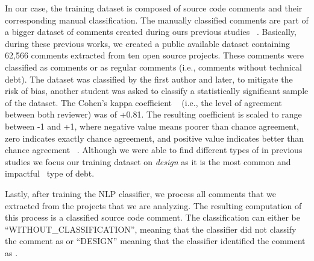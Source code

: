 In our case, the training dataset is composed of source code comments and their corresponding manual classification. The manually classified comments are part of a bigger dataset of \SATD comments created during ours previous studies ~\cite{Maldonado2015MTD,Maldonado2015TSE}. Basically, during these previous works, we created a public available dataset containing 62,566 comments extracted from ten open source projects. These comments were classified as \SATD comments or as regular comments (i.e., comments without technical debt). The dataset was classified by the first author and later, to mitigate the risk of bias, another student was asked to classify a statistically significant sample of the dataset. The Cohen's kappa coefficient ~\cite{cohen1960coefficient} (i.e., the level of agreement between both reviewer) was of +0.81. The resulting coefficient is scaled to range between -1 and +1, where negative value means poorer than chance agreement, zero indicates exactly chance agreement, and positive value indicates better than chance agreement ~\cite{fleiss1973equivalence}. Although we were able to find different types of \SATD in previous studies we focus our training dataset on \emph{design \SATD} as it is the most common and impactful~\cite{Ernst2015FSE} type of debt. 

Lastly, after training the NLP classifier, we process all comments that we extracted from the projects that we are analyzing. The resulting computation of this process is a classified source code comment. The classification can either be ``WITHOUT\_CLASSIFICATION'', meaning  that the classifier did not classify the comment as \SATD or ``DESIGN'' meaning that the classifier identified the comment as \SATD.




